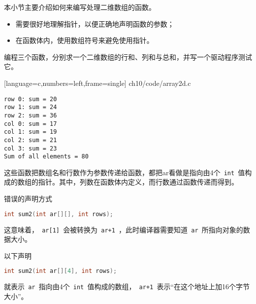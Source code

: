 \begin{frame}[fragile]
本小节主要介绍如何来编写处理二维数组的函数。\vspace{.05in}

\begin{itemize}
\item 需要很好地理解指针，以便正确地声明函数的参数；\\[0.05in]
\item 在函数体内，使用数组符号来避免使用指针。
\end{itemize}
\end{frame}

\begin{frame}[fragile]
编程三个函数，分别求一个二维数组的行和、列和与总和，并写一个驱动程序测试它。
\end{frame}

\begin{frame}

[language=c,numbers=left,frame=single]
{ch10/code/array2d.c}
\end{frame}



\begin{frame}[fragile]
\begin{lstlisting}[backgroundcolor=\color{red!20}]
row 0: sum = 20
row 1: sum = 24
row 2: sum = 36
col 0: sum = 17
col 1: sum = 19
col 2: sum = 21
col 3: sum = 23
Sum of all elements = 80
\end{lstlisting}
\end{frame}


\begin{frame}[fragile]
这些函数把数组名和行数作为参数传递给函数，都把ar看做是指向由4个\lstinline| int |值构成的数组的指针。其中，列数在函数体内定义，而行数通过函数传递而得到。\vspace{0.05in}

\end{frame}


\begin{frame}[fragile]
错误的声明方式
\begin{lstlisting}[language=c,backgroundcolor=\color{red!20}]
int sum2(int ar[][], int rows);
\end{lstlisting}
这意味着，\lstinline| ar[1] |会被转换为\lstinline| ar+1 |，此时编译器需要知道\lstinline| ar |所指向对象的数据大小。\pause \vspace{0.15in}

以下声明
\begin{lstlisting}[language=c,backgroundcolor=\color{red!20}]
int sum2(int ar[][4], int rows);
\end{lstlisting}
就表示\lstinline| ar |指向由4个\lstinline| int |值构成的数组，\lstinline| ar+1 |表示“在这个地址上加16个字节大小”。
\end{frame}


